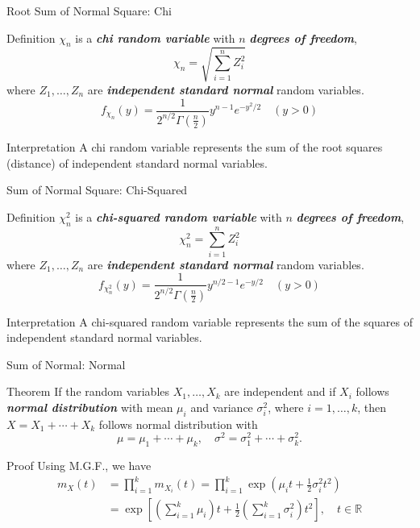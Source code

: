 \documentclass{beamer}
\newcommand{\bb}[1]{\textcolor{antiquefuchsia}{\textbf{\textit{#1}}}}
\begin{document}
\begin{frame}{Root Sum of Normal Square: Chi}
\begin{block}{Definition}
$\chi_{n}$ is a \bb{chi random variable} with $n$ \bb{degrees of freedom},
$$
\chi_{n}=\sqrt{\sum_{i=1}^{n} Z_{i}^{2}}
$$
where $Z_{1}, \ldots, Z_{n}$ are \bb{independent standard normal} random variables. 
$$f_{\chi_{n}}(y)=\frac{1}{2^{n / 2} \Gamma\left(\frac{n}{2}\right)} y^{n-1} e^{-y^2 / 2}\quad (y>0)$$
\end{block}

\begin{block}{Interpretation}
A chi random variable represents the sum of the root squares (distance) of independent standard normal variables.
\end{block}
\end{frame}



\begin{frame}{Sum of Normal Square: Chi-Squared}
\begin{block}{Definition}
$\chi_{n}^2$ is a \bb{chi-squared random variable} with $n$ \bb{degrees of freedom},
$$
\chi_{n}^{2}=\sum_{i=1}^{n} Z_{i}^{2}
$$
where $Z_{1}, \ldots, Z_{n}$ are \bb{independent standard normal} random variables. 
$$f_{\chi_{n}^{2}}(y)=\frac{1}{2^{n / 2} \Gamma\left(\frac{n}{2}\right)} y^{n / 2-1} e^{-y / 2}\quad (y>0)$$
\end{block}

\begin{block}{Interpretation}
A chi-squared random variable represents the sum of the squares of independent standard normal variables.
\end{block}
\end{frame}

\begin{frame}{Sum of Normal: Normal}
\begin{block}{Theorem}
If the random variables $X_{1}, \ldots, X_{k}$ are independent and if $X_{i}$ follows \bb{normal distribution} with mean $\mu_{i}$ and variance $\sigma_{i}^{2}$, where $i=1, \ldots, k$, then
$
X=X_{1}+\cdots+X_{k}
$
follows normal distribution with
$$
\mu=\mu_{1}+\cdots+\mu_{k}, \quad \sigma^{2}=\sigma_{1}^{2}+\cdots+\sigma_{k}^{2} .
$$
\end{block}
\begin{block}{Proof}
Using M.G.F., we have
$$
\begin{aligned}
m_{X}(t) &=\prod_{i=1}^{k} m_{X_{i}}(t)=\prod_{i=1}^{k} \exp \left(\mu_{i} t+\frac{1}{2} \sigma_{i}^{2} t^{2}\right) \\
&=\exp \left[\left(\sum_{i=1}^{k} \mu_{i}\right) t+\frac{1}{2}\left(\sum_{i=1}^{k} \sigma_{i}^{2}\right) t^{2}\right], \quad t \in \mathbb{R}
\end{aligned}
$$
\end{block}
\end{frame}
\end{document}
